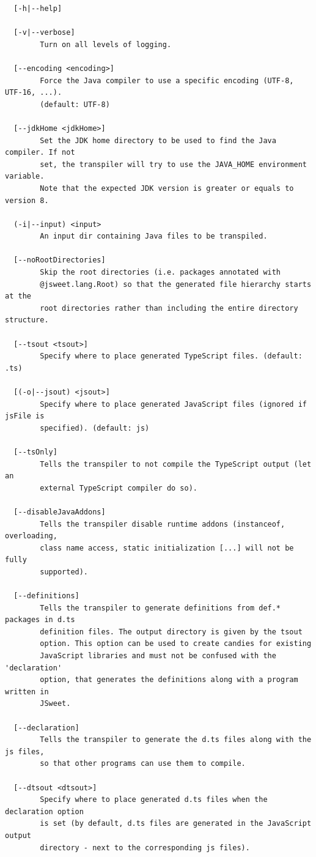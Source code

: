 \documentclass[a4paper]{report}
\begin{document}
\begin{small}
\begin{verbatim}
  [-h|--help]

  [-v|--verbose]
        Turn on all levels of logging.

  [--encoding <encoding>]
        Force the Java compiler to use a specific encoding (UTF-8, UTF-16, ...).
        (default: UTF-8)

  [--jdkHome <jdkHome>]
        Set the JDK home directory to be used to find the Java compiler. If not
        set, the transpiler will try to use the JAVA_HOME environment variable.
        Note that the expected JDK version is greater or equals to version 8.

  (-i|--input) <input>
        An input dir containing Java files to be transpiled.

  [--noRootDirectories]
        Skip the root directories (i.e. packages annotated with
        @jsweet.lang.Root) so that the generated file hierarchy starts at the
        root directories rather than including the entire directory structure.

  [--tsout <tsout>]
        Specify where to place generated TypeScript files. (default: .ts)

  [(-o|--jsout) <jsout>]
        Specify where to place generated JavaScript files (ignored if jsFile is
        specified). (default: js)

  [--tsOnly]
        Tells the transpiler to not compile the TypeScript output (let an
        external TypeScript compiler do so).

  [--disableJavaAddons]
        Tells the transpiler disable runtime addons (instanceof, overloading,
        class name access, static initialization [...] will not be fully
        supported).

  [--definitions]
        Tells the transpiler to generate definitions from def.* packages in d.ts
        definition files. The output directory is given by the tsout
        option. This option can be used to create candies for existing
        JavaScript libraries and must not be confused with the 'declaration'
        option, that generates the definitions along with a program written in
        JSweet.

  [--declaration]
        Tells the transpiler to generate the d.ts files along with the js files,
        so that other programs can use them to compile.

  [--dtsout <dtsout>]
        Specify where to place generated d.ts files when the declaration option
        is set (by default, d.ts files are generated in the JavaScript output
        directory - next to the corresponding js files).


\end{verbatim}
\end{small}
\end{document}
